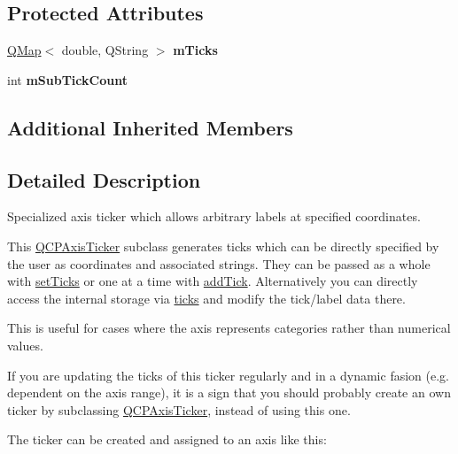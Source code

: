\subsection*{Protected Attributes}
\begin{DoxyCompactItemize}
\item 
\hyperlink{class_q_map}{Q\+Map}$<$ double, Q\+String $>$ {\bfseries m\+Ticks}\hypertarget{class_q_c_p_axis_ticker_text_aebd34e6c0515fe12343c9c7916a71c60}{}\label{class_q_c_p_axis_ticker_text_aebd34e6c0515fe12343c9c7916a71c60}

\item 
int {\bfseries m\+Sub\+Tick\+Count}\hypertarget{class_q_c_p_axis_ticker_text_a206d092b1598eecb981bba7fb16ff44e}{}\label{class_q_c_p_axis_ticker_text_a206d092b1598eecb981bba7fb16ff44e}

\end{DoxyCompactItemize}
\subsection*{Additional Inherited Members}


\subsection{Detailed Description}
Specialized axis ticker which allows arbitrary labels at specified coordinates. 



This \hyperlink{class_q_c_p_axis_ticker}{Q\+C\+P\+Axis\+Ticker} subclass generates ticks which can be directly specified by the user as coordinates and associated strings. They can be passed as a whole with \hyperlink{class_q_c_p_axis_ticker_text_a8cdf1f21940f1f53f5e3d30b2c74f5cf}{set\+Ticks} or one at a time with \hyperlink{class_q_c_p_axis_ticker_text_aada3db69e5fc6585aaa4ea5d89552eb0}{add\+Tick}. Alternatively you can directly access the internal storage via \hyperlink{class_q_c_p_axis_ticker_text_ac84622a6bb4f2a98474e185ecaf3189a}{ticks} and modify the tick/label data there.

This is useful for cases where the axis represents categories rather than numerical values.

If you are updating the ticks of this ticker regularly and in a dynamic fasion (e.\+g. dependent on the axis range), it is a sign that you should probably create an own ticker by subclassing \hyperlink{class_q_c_p_axis_ticker}{Q\+C\+P\+Axis\+Ticker}, instead of using this one.

The ticker can be created and assigned to an axis like this\+: 
\begin{DoxyCodeInclude}
\end{DoxyCodeInclude}


